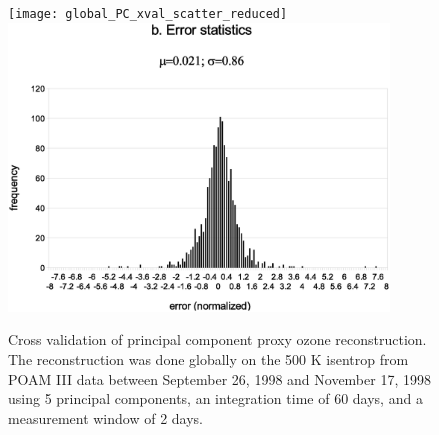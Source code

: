 \begin{figure}
  \centering
  \texttt{[image: global\_PC\_xval\_scatter\_reduced]}
  \includegraphics[width=0.9\textwidth]{global_PC_xval_error}
  \caption{Cross validation of principal component proxy ozone reconstruction. The reconstruction was done globally on the 500 K isentrop from POAM III data between September 26, 1998 and November 17, 1998 using 5 principal components,  an integration time of 60 days, and a measurement window of 2 days.}
  \label{PC_cross_validation}
\end{figure}

